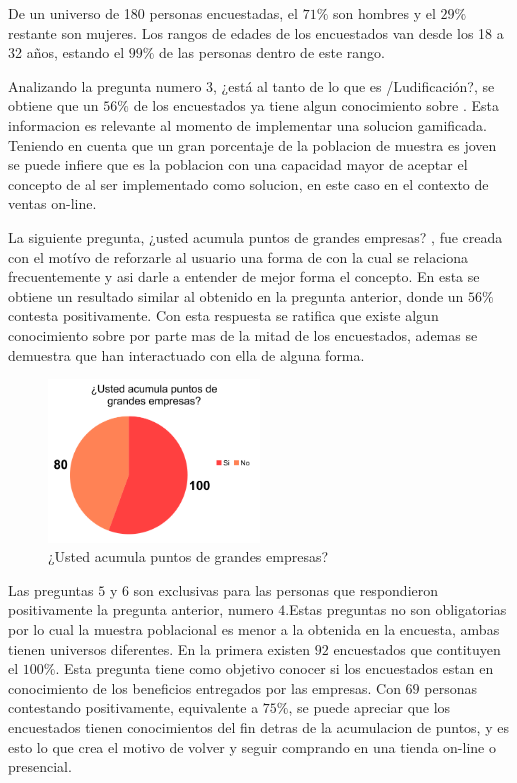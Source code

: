 De un universo de 180 personas encuestadas, el $71\%$ son hombres y el $29\%$ restante son mujeres.
Los rangos de edades de los encuestados van desde los 18 a 32 años, estando el $99\%$ de las personas
dentro de este rango.

Analizando la pregunta numero 3, ¿está al tanto de lo que es {\GAM}/Ludificación?, se obtiene que
 un $56\%$ de los encuestados ya tiene algun conocimiento  sobre {\GAM}. Esta informacion es relevante
al momento de implementar una solucion gamificada. Teniendo en cuenta que un gran porcentaje de la
poblacion de muestra es joven se puede infiere que es la poblacion con una capacidad mayor de aceptar
el concepto de {\GAM} al ser implementado como solucion, en este caso en el contexto de ventas on-line.


La siguiente pregunta, ¿usted acumula puntos de grandes empresas? , fue creada con el motívo de 
reforzarle al usuario una forma de {\GAM} con la cual se relaciona frecuentemente y asi darle
a entender de mejor forma el concepto. En esta se obtiene un resultado similar al obtenido en 
la pregunta anterior, donde un $56\%$ contesta positivamente. Con esta respuesta se ratifica que existe
algun conocimiento sobre {\GAM} por parte mas de la mitad de los encuestados, ademas se demuestra que
han interactuado con ella de alguna forma.

\begin{figure}[!htb]
  \centering
  \includegraphics[width=0.5\textwidth]{images/chartPreg4.png}
  \caption[chart4]{¿Usted acumula puntos de grandes empresas?}
  \label{fig:chart2}
\end{figure}

Las preguntas $5$ y $6$ son exclusivas para las personas que respondieron positivamente la
pregunta anterior, numero $4$.Estas preguntas no son obligatorias por lo cual la muestra poblacional
es menor a la obtenida en la encuesta, ambas tienen universos diferentes.
En la primera existen $92$ encuestados que contituyen el $100\%$. Esta pregunta tiene como objetivo 
conocer si los encuestados estan en conocimiento de los beneficios entregados por las empresas.  
Con $69$ personas contestando positivamente, equivalente a $75\%$, se puede apreciar que los 
encuestados tienen conocimientos del fin detras de la acumulacion de puntos, y es esto lo que
crea el motivo de volver y seguir comprando en una tienda on-line o presencial.

